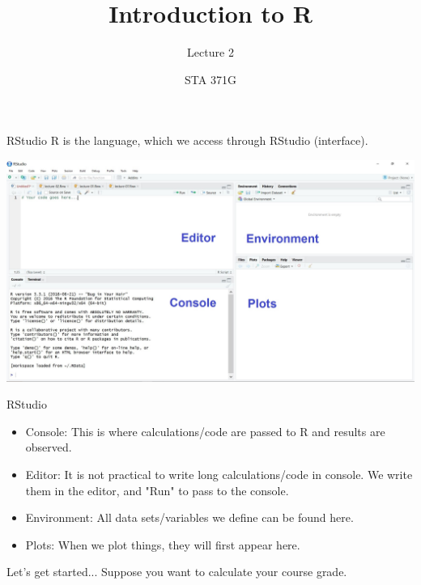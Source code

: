 \documentclass{beamer}\usepackage[]{graphicx}\usepackage[]{color}
\title{Introduction to R}
\subtitle{Lecture 2}
\author{STA 371G}
\begin{document}
  \frame{\maketitle}


  \begin{darkframes}



    \begin{frame}{RStudio}
     R is the language, which we access through RStudio (interface).\pause
      \begin{center}
        \includegraphics[width=\textwidth]{RStudio}
      \end{center}
    \end{frame}

    \begin{frame}{RStudio}
      \begin{itemize}
        \item \alert{Console:} This is where calculations/code are passed to R and results are observed. \pause
        \item \alert{Editor:} It is not practical to write long calculations/code in console. We write them in the editor, and "Run" to pass to the console. \pause
        \item \alert{Environment:} All data sets/variables we define can be found here. \pause
        \item \alert{Plots:} When we plot things, they will first appear here.
      \end{itemize}
    \end{frame}

    \begin{frame}{Let's get started...}
    Suppose you want to calculate your course grade.


\end{frame}
\end{darkframes}
\end{document}
